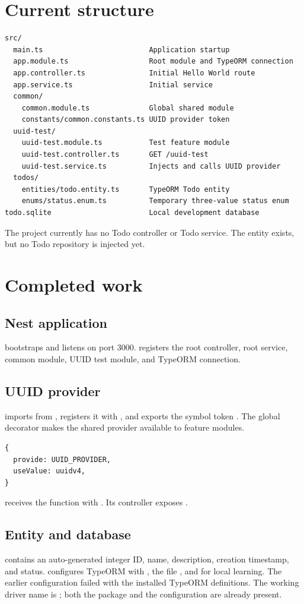 \section{Current structure}
\begin{lstlisting}[language={}]
src/
  main.ts                         Application startup
  app.module.ts                   Root module and TypeORM connection
  app.controller.ts               Initial Hello World route
  app.service.ts                  Initial service
  common/
    common.module.ts              Global shared module
    constants/common.constants.ts UUID provider token
  uuid-test/
    uuid-test.module.ts           Test feature module
    uuid-test.controller.ts       GET /uuid-test
    uuid-test.service.ts          Injects and calls UUID provider
  todos/
    entities/todo.entity.ts       TypeORM Todo entity
    enums/status.enum.ts          Temporary three-value status enum
todo.sqlite                       Local development database
\end{lstlisting}
The project currently has no Todo controller or Todo service. The entity exists, but no Todo repository is injected yet.

\section{Completed work}
\subsection{Nest application}
 bootstraps  and listens on port 3000.  registers the root controller, root service, common module, UUID test module, and TypeORM connection.

\subsection{UUID provider}
 imports  from , registers it with , and exports the symbol token . The global decorator makes the shared provider available to feature modules.
\begin{lstlisting}
{
  provide: UUID_PROVIDER,
  useValue: uuidv4,
}
\end{lstlisting}
 receives the function with . Its controller exposes .

\subsection{Entity and database}
 contains an auto-generated integer ID, name, description, creation timestamp, and status.  configures TypeORM with , the file , and  for local learning.
The earlier configuration  failed with the installed TypeORM definitions. The working driver name is ; both the package and the configuration are already present.

